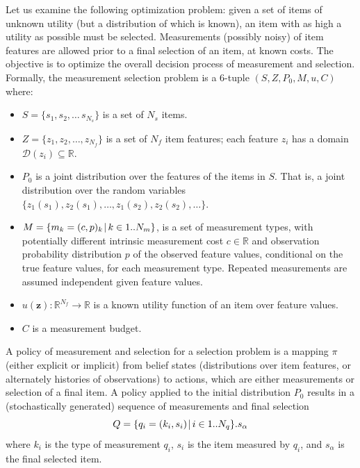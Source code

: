 Let us examine the following optimization problem:
given a set of items of unknown utility (but a
distribution of which is known), an item with as high a utility as
possible must be selected.  Measurements (possibly noisy) of item
features are allowed prior to a final selection of an item,
at known costs. The objective
is to optimize the overall decision process of measurement and
selection. Formally, the measurement selection problem is a 6-tuple
$(S, Z, P_0, M, u, C)$ where:
\begin{itemize}
\item $S=\{s_1, s_2, \ldots\, s_{N_s}\}$ is a set of $N_s$ items.
\item $Z=\{ z_1, z_2, \ldots, z_{N_f}\}$ is a set of $N_f$ item 
features; each feature
$z_i$ has a domain $\mathcal{D}(z_i)\subseteq \mathbb{R}$.
\item $P_0$ is a joint distribution over the features of the items in $S$. That is,
a joint distribution over the random
variables $\{ z_1(s_1), z_2(s_1),\ldots , z_1(s_2), z_2(s_2),\ldots\} $.
\item $M=\{m_k=(c, p)_k\:\vline\; k \in 1..N_m\}$, is a set of measurement types,
  with potentially different intrinsic measurement cost $c\in \mathbb{R}$ and
  observation probability distribution $p$ of the observed feature
  values, conditional on the true feature values, for each
  measurement type. Repeated measurements are assumed independent given feature values.
\item $u(\textbf{z})\colon\mathbb{R}^{N_f}\to \mathbb{R}$ is a known utility function of an item over feature values.
\item $C$ is a measurement budget.
\end{itemize}

A policy of measurement and selection for a selection problem is a mapping
$\pi $ (either explicit or implicit) from belief states (distributions over 
item features, or alternately histories of observations) to actions, which are
either measurements or selection of a final item. A policy applied
to the initial distribution $P_0$ results in a (stochastically generated)
sequence of measurements and final selection 
\begin{equation}
\label{eq:measurement-sequence}
Q=\{q_i=(k_i,s_i)\:\vline\;i \in 1..N_q\}.s_\alpha
\end{equation}
where $k_i$ is the type of measurement $q_i$, $s_i$ is the item
measured by $q_i$, and $s_\alpha$ is the final selected item.

